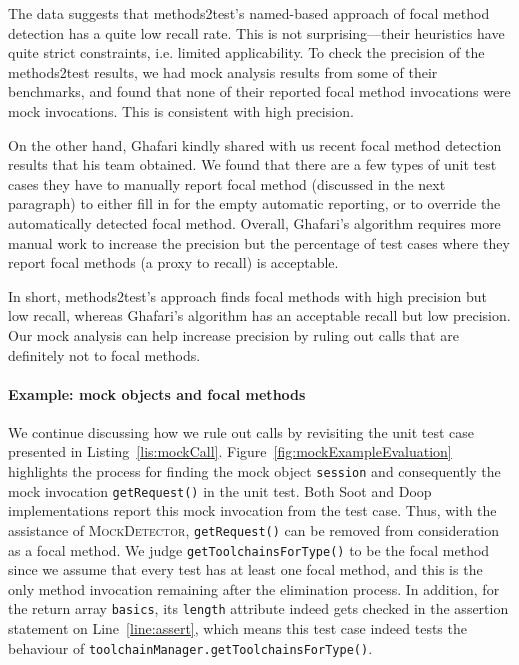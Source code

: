The data suggests that methods2test's named-based approach of focal method detection has a quite low recall rate. This is not surprising---their heuristics have quite strict constraints, i.e. limited applicability. To check the precision of the methods2test results, we had mock analysis results from some of their benchmarks, and found that none of their reported focal method invocations were mock invocations. This is consistent with high precision.

On the other hand, Ghafari kindly shared with us recent focal method detection results that his team obtained. We found that there are a few types of unit test cases they have to manually report focal method (discussed in the next paragraph) to either fill in for the empty automatic reporting, or to override the automatically detected focal method. Overall, Ghafari's algorithm requires more manual work to increase the precision but the percentage of test cases where they report focal methods (a proxy to recall) is acceptable. 

In short, methods2test's approach finds focal methods with high precision but low recall, whereas Ghafari's algorithm has an acceptable recall but low precision. Our mock analysis can help increase precision by ruling out calls that are definitely not to focal methods.

\paragraph{Example: mock objects and focal methods} We continue discussing how we rule out calls by revisiting the unit test case presented in Listing~\ref{lis:mockCall}. Figure~\ref{fig:mockExampleEvaluation} highlights the process for finding the mock object \texttt{session} and consequently the mock invocation \texttt{getRequest()} in the unit test. Both Soot and Doop implementations report this mock invocation 
from the test case. Thus, with the assistance of \textsc{MockDetector}, \texttt{getRequest()} can be removed from consideration as a focal method. We judge \texttt{getToolchainsForType()} to be the focal method since we assume that every test has at least one focal method, and this is the only method invocation remaining after the elimination process. In addition, for the return array \texttt{basics}, its \texttt{length} attribute indeed gets checked in the assertion statement on Line~\ref{line:assert}, which means this test case indeed tests the behaviour of \texttt{toolchainManager.getToolchainsForType()}. 

